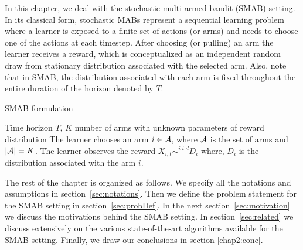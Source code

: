 In this chapter, we deal with the stochastic multi-armed bandit (SMAB) setting. In its classical form, stochastic MABs represent a sequential learning problem where a learner is exposed to a finite set of actions (or arms) and needs to choose one of the actions at each timestep. After choosing (or pulling) an arm the learner receives a reward, which is conceptualized as an independent random draw from stationary distribution associated with the selected arm. Also, note that in SMAB, the distribution associated with each arm is fixed throughout the entire duration of the horizon denoted by $T$.

\begin{algorithm}[!th]
\caption{SMAB formulation}
\label{alg:SMAB}
\begin{algorithmic}
 Time horizon $T$, $K$ number of arms with unknown parameters of reward distribution
\State {}
\State The learner chooses an arm $i\in\mathcal{A}$, where $\mathcal{A}$ is the set of arms and $|\mathcal{A}|=K$.
\State The learner observes the reward $X_{i,t}\sim^{i.i.d} D_{i}$ where, $D_{i}$ is the distribution associated with the arm $i$. 
\State \EndFor
\end{algorithmic}
\end{algorithm}
	 
The rest of the chapter is organized as follows. We specify all the notations and assumptions in section~\ref{sec:notations}. Then we define the problem statement for the SMAB setting in section~\ref{sec:probDef}. In the next section~\ref{sec:motivation} we discuss the motivations behind the SMAB setting. In section~\ref{sec:related} we discuss extensively on the various state-of-the-art algorithms available for the SMAB setting. Finally, we draw our conclusions in section \ref{chap2:conc}.